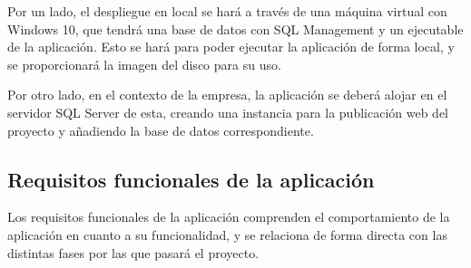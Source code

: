 Por un lado, el despliegue en local se hará a través de una máquina virtual con Windows 10, que tendrá una base de datos con SQL Management y un ejecutable de la aplicación. Esto se hará para poder ejecutar la aplicación de forma local, y se proporcionará la imagen del disco para su uso.

Por otro lado, en el contexto de la empresa, la aplicación se deberá alojar en el servidor SQL Server de esta, creando una instancia para la publicación web del proyecto y añadiendo la base de datos correspondiente.

\subsection{Requisitos funcionales de la aplicación}
Los requisitos funcionales de la aplicación comprenden el comportamiento de la aplicación
en cuanto a su funcionalidad, y se relaciona de forma directa con las distintas fases por las que pasará el proyecto. 

